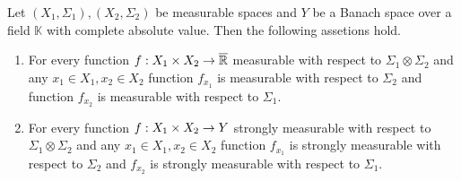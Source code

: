 \begin{proposition}\label{proposition:measurable_functions_have_measurable_sections}
Let $(X_1,\Sigma_1), (X_2,\Sigma_2)$ be measurable spaces and $Y$ be a Banach space over a field $\mathbb{K}$ with complete absolute value. Then the following assetions hold.
\begin{enumerate}[label=\emph{\textbf{(\arabic*)}}, leftmargin=*]
\item For every function $f:X_1\times X_2\rightarrow \overline{{\mathbb R}}$ measurable with respect to $\Sigma_1\otimes \Sigma_2$ and any $x_1\in X_1,x_2\in X_2$ function $f_{x_1}$ is measurable with respect to $\Sigma_2$ and function $f_{x_2}$ is measurable with respect to $\Sigma_1$.
\item For every function $f:X_1\times X_2\rightarrow Y$ strongly measurable with respect to $\Sigma_1\otimes \Sigma_2$ and any $x_1\in X_1,x_2\in X_2$ function $f_{x_1}$ is strongly measurable with respect to $\Sigma_2$ and $f_{x_2}$ is strongly measurable with respect to $\Sigma_1$.
\end{enumerate}
\end{proposition}
